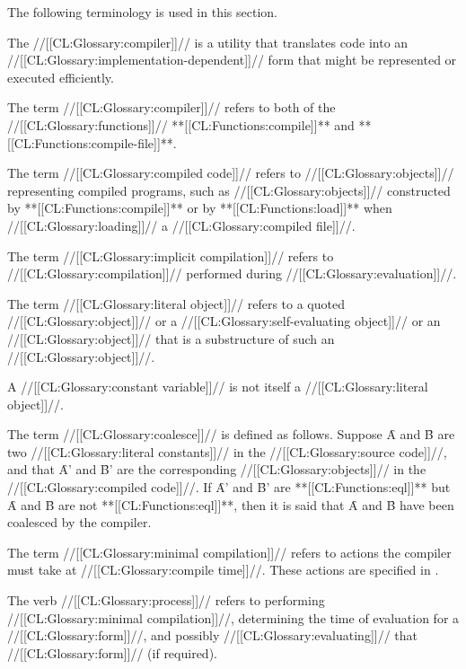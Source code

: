 

\def\sim#1#2#3{{\cal S}\sub{#1}(#2,#3)}

 

  The following terminology is used in this section.
 

The //[[CL:Glossary:compiler]]// is a utility that translates code into an //[[CL:Glossary:implementation-dependent]]// form that might be represented or executed efficiently.

The term //[[CL:Glossary:compiler]]// refers to both of the //[[CL:Glossary:functions]]// **[[CL:Functions:compile]]** and **[[CL:Functions:compile-file]]**.

The term //[[CL:Glossary:compiled code]]// refers to  //[[CL:Glossary:objects]]// representing compiled programs, such as //[[CL:Glossary:objects]]// constructed by **[[CL:Functions:compile]]** or by **[[CL:Functions:load]]** when //[[CL:Glossary:loading]]// a //[[CL:Glossary:compiled file]]//.

The term //[[CL:Glossary:implicit compilation]]// refers to //[[CL:Glossary:compilation]]// performed during //[[CL:Glossary:evaluation]]//.


The term //[[CL:Glossary:literal object]]// refers to 
     a quoted //[[CL:Glossary:object]]// 
  or a //[[CL:Glossary:self-evaluating object]]// 
  or an //[[CL:Glossary:object]]// that is a substructure of such an //[[CL:Glossary:object]]//.

A //[[CL:Glossary:constant variable]]// is not itself a //[[CL:Glossary:literal object]]//.

 

The term //[[CL:Glossary:coalesce]]// is defined as follows. Suppose \f{A} and \f{B} are two //[[CL:Glossary:literal constants]]// in the //[[CL:Glossary:source code]]//, and that \f{A'} and \f{B'} are the corresponding //[[CL:Glossary:objects]]// in the //[[CL:Glossary:compiled code]]//. If \f{A'} and \f{B'} are **[[CL:Functions:eql]]** but \f{A} and \f{B} are not **[[CL:Functions:eql]]**, then it is said that \f{A} and \f{B} have been coalesced by the compiler.

The term //[[CL:Glossary:minimal compilation]]// refers to actions the compiler must take at //[[CL:Glossary:compile time]]//. These actions are specified in  \secref\CompilationSemantics.

The verb //[[CL:Glossary:process]]// refers to performing //[[CL:Glossary:minimal compilation]]//, determining the time of evaluation for a //[[CL:Glossary:form]]//, and possibly //[[CL:Glossary:evaluating]]// that //[[CL:Glossary:form]]// (if required).


